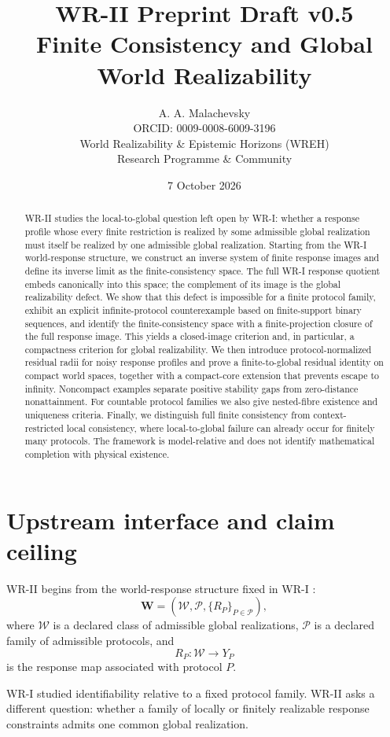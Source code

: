 \documentclass[11pt]{article}
\title{\textbf{WR-II Preprint Draft v0.5}\\[4pt]
\large Finite Consistency and Global World Realizability}
\author{A. A. Malachevsky\\
ORCID: 0009-0008-6009-3196\\
World Realizability \& Epistemic Horizons (WREH)\\
Research Programme \& Community}
\date{7 October 2026}
\newcommand{\W}{\mathcal W}
\newcommand{\Pcal}{\mathcal P}
\begin{document}
\maketitle

\begin{abstract}
WR-II studies the local-to-global question left open by WR-I: whether a response
profile whose every finite restriction is realized by some admissible global
realization must itself be realized by one admissible global realization.
Starting from the WR-I world-response structure, we construct an inverse system
of finite response images and define its inverse limit as the finite-consistency
space. The full WR-I response quotient embeds canonically into this space; the
complement of its image is the global realizability defect. We show that this
defect is impossible for a finite protocol family, exhibit an explicit
infinite-protocol counterexample based on finite-support binary sequences, and
identify the finite-consistency space with a finite-projection closure of the
full response image. This yields a closed-image criterion and, in particular,
a compactness criterion for global realizability. We then introduce
protocol-normalized residual radii for noisy response profiles and prove a
finite-to-global residual identity on compact world spaces, together with a
compact-core extension that prevents escape to infinity. Noncompact examples
separate positive stability gaps from zero-distance nonattainment. For
countable protocol families we also give nested-fibre existence and uniqueness
criteria. Finally, we distinguish full finite consistency from
context-restricted local consistency, where local-to-global failure can already
occur for finitely many protocols. The framework is model-relative and does
not identify mathematical completion with physical existence.
\end{abstract}

\section{Upstream interface and claim ceiling}

WR-II begins from the world-response structure fixed in WR-I
\cite{MalachevskyWRI}:
\[
\mathbf W=(\W,\Pcal,\{R_P\}_{P\in\Pcal}),
\]
where $\W$ is a declared class of admissible global realizations, $\Pcal$ is a
declared family of admissible protocols, and
\[
R_P:\W\to Y_P
\]
is the response map associated with protocol $P$.

WR-I studied identifiability relative to a fixed protocol family. WR-II asks a
different question: whether a family of locally or finitely realizable response
constraints admits one common global realization.
\end{document}
